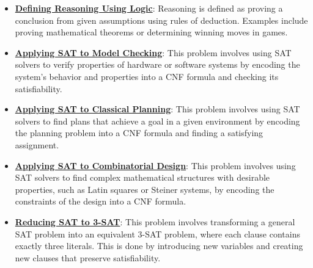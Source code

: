 \documentclass{article}%
\begin{document}
\begin{itemize}[leftmargin=*]%
\item \href{https://purdue.brightspace.com/d2l/common/assets/pdfjs-d2l-dist/1.0.14-legacy/web/viewer.html?file=\%2Fcontent\%2Fenforced\%2F1095467-wl.202510.CS.24300.001\%2F13L1-Logic.pdf\%3Fou\%3D1095467\&lang=en-us\&container=d2l-fileviewer-rendered-pdf\&fullscreen=d2l-fileviewer-rendered-pdf-dialog\&height=667#page=7}{\textbf{Defining Reasoning Using Logic}}: Reasoning is defined as proving a conclusion from given assumptions using rules of deduction. Examples include proving mathematical theorems or determining winning moves in games.%
\item \href{https://purdue.brightspace.com/d2l/common/assets/pdfjs-d2l-dist/1.0.14-legacy/web/viewer.html?file=\%2Fcontent\%2Fenforced\%2F1095467-wl.202510.CS.24300.001\%2F13L1-Logic.pdf\%3Fou\%3D1095467\&lang=en-us\&container=d2l-fileviewer-rendered-pdf\&fullscreen=d2l-fileviewer-rendered-pdf-dialog\&height=667#page=20}{\textbf{Applying SAT to Model Checking}}: This problem involves using SAT solvers to verify properties of hardware or software systems by encoding the system's behavior and properties into a CNF formula and checking its satisfiability.%
\item \href{https://purdue.brightspace.com/d2l/common/assets/pdfjs-d2l-dist/1.0.14-legacy/web/viewer.html?file=\%2Fcontent\%2Fenforced\%2F1095467-wl.202510.CS.24300.001\%2F13L1-Logic.pdf\%3Fou\%3D1095467\&lang=en-us\&container=d2l-fileviewer-rendered-pdf\&fullscreen=d2l-fileviewer-rendered-pdf-dialog\&height=667#page=21}{\textbf{Applying SAT to Classical Planning}}: This problem involves using SAT solvers to find plans that achieve a goal in a given environment by encoding the planning problem into a CNF formula and finding a satisfying assignment.%
\item \href{https://purdue.brightspace.com/d2l/common/assets/pdfjs-d2l-dist/1.0.14-legacy/web/viewer.html?file=\%2Fcontent\%2Fenforced\%2F1095467-wl.202510.CS.24300.001\%2F13L1-Logic.pdf\%3Fou\%3D1095467\&lang=en-us\&container=d2l-fileviewer-rendered-pdf\&fullscreen=d2l-fileviewer-rendered-pdf-dialog\&height=667#page=22}{\textbf{Applying SAT to Combinatorial Design}}: This problem involves using SAT solvers to find complex mathematical structures with desirable properties, such as Latin squares or Steiner systems, by encoding the constraints of the design into a CNF formula.%
\item \href{https://purdue.brightspace.com/d2l/common/assets/pdfjs-d2l-dist/1.0.14-legacy/web/viewer.html?file=\%2Fcontent\%2Fenforced\%2F1095467-wl.202510.CS.24300.001\%2F13L1-Logic.pdf\%3Fou\%3D1095467\&lang=en-us\&container=d2l-fileviewer-rendered-pdf\&fullscreen=d2l-fileviewer-rendered-pdf-dialog\&height=667#page=24}{\textbf{Reducing SAT to 3-SAT}}: This problem involves transforming a general SAT problem into an equivalent 3-SAT problem, where each clause contains exactly three literals. This is done by introducing new variables and creating new clauses that preserve satisfiability.%

\end{itemize}
\end{document}
